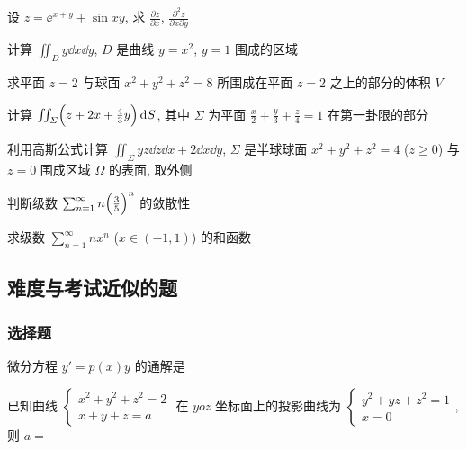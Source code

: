 \begin{ti}
	设 $z = \ee^{x+y} + \sin xy$, 求 $\frac{\partial z}{\partial x}$, $\frac{\partial^2z}{\partial x \partial y}$
\end{ti}

\begin{ti}
	计算 $\iint_D y \dd{x} \dd{y}$, $D$ 是曲线 $y = x^2$, $y = 1$ 围成的区域
\end{ti}

\begin{ti}
	求平面 $z = 2$ 与球面 $x^2 + y^2 + z^2 = 8$ 所围成在平面 $z = 2$ 之上的部分的体积 $V$
\end{ti}

\begin{ti}
	计算 $\iint_{\varSigma} \Bigl( z + 2x + \frac{4}{3}y \Bigr) \dd{S}$, 其中 $\varSigma$ 为平面 $\frac{x}{2} + \frac{y}{3} + \frac{z}{4} = 1$ 在第一卦限的部分
\end{ti}

\begin{ti}
	利用高斯公式计算 $\iint_{\varSigma} yz \dd{z} \dd{x} + 2 \dd{x} \dd{y}$, $\varSigma$ 是半球球面 $x^2 + y^2 + z^2 = 4$ ($z \geqslant 0$) 与 $z = 0$ 围成区域 $\Omega$ 的表面, 取外侧
\end{ti}

\begin{ti}
	判断级数 $\sum_{n=1}^{\infty} n \Bigl( \frac{3}{5} \Bigr)^n$ 的敛散性
\end{ti}

\begin{ti}
	求级数 $\sum_{n=1}^{\infty} n x^n$ ($x \in (-1,1)$) 的和函数
\end{ti}

\subsection{难度与考试近似的题}
\subsubsection{选择题}
\begin{ti}
	微分方程 $y'=p(x) y$ 的通解是 \kuo
\end{ti}

\begin{ti}
	已知曲线 $\begin{cases}
		x^{2}+y^{2}+z^{2}=2\\
		x+y+z=a
	\end{cases}$ 在 $yoz$ 坐标面上的投影曲线为 $\begin{cases}
		y^{2}+y z+z^{2}=1\\
		x=0
	\end{cases}$, 则 $a=$ \kuo
\end{ti}

